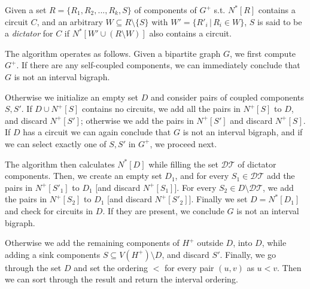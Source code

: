 Given a set $R = \{ R_1, R_2, ..., R_k, S \}$ of components of $G^+$ s.t. $N^*[R]$ contains a circuit $C$, and an arbitrary $W \subseteq R \setminus \{S\}$ with $W' = \{ R'_i \, | \, R_i \in W\}$, $S$ is said to be a {\em dictator} for $C$ if $N^*[W' \cup (R \setminus W)]$ also contains a circuit.

The algorithm operates as follows.
Given a bipartite graph $G$, we first compute $G^+$.
If there are any self-coupled components, we can immediately conclude that $G$ is not an interval bigraph.

Otherwise we initialize an empty set $D$ and consider pairs of coupled components $S, S'$.
If $D \cup N^+[S]$ contains no circuits, we add all the pairs in $N^+[S]$ to $D$, and discard $N^+[S']$; otherwise we add the pairs in $N^+[S']$ and discard $N^+[S]$.
If $D$ has a circuit we can again conclude that $G$ is not an interval bigraph, and if we can select exactly one of $S, S'$ in $G^+$, we proceed next.

The algorithm then calculates $N^*[D]$ while filling the set $\mathcal{DT}$ of dictator components.
Then, we create an empty set $D_1$, and for every $S_1 \in \mathcal{DT}$ add the pairs in $N^+[S'_1]$ to $D_1$ [and discard $N^+[S_1]$].
For every $S_2 \in D \setminus \mathcal{DT}$, we add the pairs in $N^+[S_2]$ to $D_1$ [and discard $N^+[S'_2]$].
Finally we set $D=N^*[D_1]$ and check for circuits in $D$.
If they are present, we conclude $G$ is not an interval bigraph.

Otherwise we add the remaining components of $H^+$ outside $D$, into $D$, while adding a sink components $S \subseteq V(H^+) \setminus D$, and discard $S'$.
Finally, we go through the set $D$ and set the ordering $<$ for every pair $(u,v)$ as $u < v$.
Then we can sort through the result and return the interval ordering.

